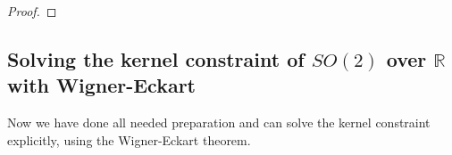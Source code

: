 \documentclass[12pt, a4paper]{article}
\theoremstyle{plain}
\theoremstyle{definition}
\theoremstyle{remark}
\newcommand{\R}{\mathds{R}}
\begin{document}
\begin{proof}
\begin{comment}
The projection $p: V_m \otimes V_m \to V_{2m}$ is given by $b_{cc} \mapsto \frac{1}{2} \cos_{l+m}$, $b_{cs} \mapsto \frac{1}{2} \sin_{l+m}$, $b_{sc} \mapsto \frac{1}{2} \sin_{l+m}$, $b_{ss} \mapsto -\frac{1}{2} \cos_{l+m}$.

The first projection to $V_0$ (corresponding to the span of $c_3$) is given by $p: V_m \otimes V_m \to V_0$, $b_{cc} \mapsto \frac{1}{2}$, $b_{cs} \mapsto 0$, $b_{sc} \mapsto 0$, $b_{ss} \mapsto \frac{1}{2}$.

The second projection to $V_0$ (corresponding to the span of $c_4$) is given by $p: V_m \otimes V_m \to V_0$, $b_{cc} \mapsto 0$, $b_{cs} \mapsto - \frac{1}{2}$, $b_{sc} \mapsto \frac{1}{2}$, $b_{ss} \mapsto 0$.
\end{comment}
\end{proof}



\subsection{Solving the kernel constraint of $SO(2)$ over $\R$ with Wigner-Eckart}

Now we have done all needed preparation and can solve the kernel constraint explicitly, using the Wigner-Eckart theorem.
\end{document}
